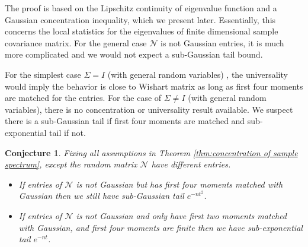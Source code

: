 \documentclass[12pt]{extarticle}
\newtheorem{conjecture}[theorem]{Conjecture}
\newcommand{\cN}{{\mathcal{N}}}
\newcommand{\1}{\field{1}}
\numberwithin{equation}{section}
\begin{document}
The proof is based on the Lipschitz continuity of eigenvalue function and a Gaussian concentration inequality, which we present  later. Essentially, this concerns the local statistics for the eigenvalues of finite dimensional sample covariance matrix. For the general case $\cN$ is not Gaussian entries, it is much more complicated and we would not expect a sub-Gaussian tail bound. 

  For the simplest case $\Sigma= I$ (with general random variables) , the universality \cite{tao2012random} would imply the behavior is close to Wishart matrix as long as first four moments are matched for the entries. For the case of $\Sigma \ne I$ (with general random variables), there is no concentration or universality result available. We suspect there is a sub-Gaussian tail if first four moments are matched and sub-exponential tail if not.
  \begin{conjecture}
  Fixing all assumptions in Theorem \ref{thm:concentration of sample spectrum}, except the random matrix $\cN$ have different entries.
  \begin{itemize}
      \item If entries of $\cN$ is not Gaussian but has first four moments matched with Gaussian then we still have sub-Gaussian tail $e^{-nt^2}$.\\
      \item If entries of $\cN$ is not Gaussian and only have first two moments  matched with Gaussian, and first four moments are finite then we  have sub-exponential tail $e^{-nt}$.
  \end{itemize}
  \end{conjecture}
\end{document}
